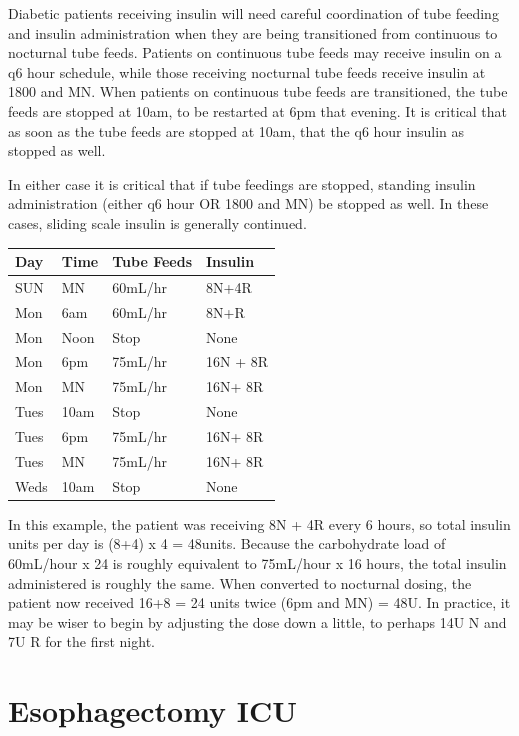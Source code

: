 \documentclass[
  letterpaper,
]{scrbook}
\begin{document}
Diabetic patients receiving insulin will need careful coordination of
tube feeding and insulin administration when they are being transitioned
from continuous to nocturnal tube feeds. Patients on continuous tube
feeds may receive insulin on a q6 hour schedule, while those receiving
nocturnal tube feeds receive insulin at 1800 and MN. When patients on
continuous tube feeds are transitioned, the tube feeds are stopped at
10am, to be restarted at 6pm that evening. It is critical that as soon
as the tube feeds are stopped at 10am, that the q6 hour insulin as
stopped as well.

In either case it is critical that if tube feedings are stopped,
standing insulin administration (either q6 hour OR 1800 and MN) be
stopped as well. In these cases, sliding scale insulin is generally
continued.

\begin{longtable}[]{@{}llll@{}}
\toprule\noalign{}
Day & Time & Tube Feeds & Insulin \\
\midrule\noalign{}
\endhead
\bottomrule\noalign{}
\endlastfoot
SUN & MN & 60mL/hr & 8N+4R \\
Mon & 6am & 60mL/hr & 8N+R \\
Mon & Noon & Stop & None \\
Mon & 6pm & 75mL/hr & 16N + 8R \\
Mon & MN & 75mL/hr & 16N+ 8R \\
Tues & 10am & Stop & None \\
Tues & 6pm & 75mL/hr & 16N+ 8R \\
Tues & MN & 75mL/hr & 16N+ 8R \\
Weds & 10am & Stop & None \\
\end{longtable}

In this example, the patient was receiving 8N + 4R every 6 hours, so
total insulin units per day is (8+4) x 4 = 48units. Because the
carbohydrate load of 60mL/hour x 24 is roughly equivalent to 75mL/hour x
16 hours, the total insulin administered is roughly the same. When
converted to nocturnal dosing, the patient now received 16+8 = 24 units
twice (6pm and MN) = 48U. In practice, it may be wiser to begin by
adjusting the dose down a little, to perhaps 14U N and 7U R for the
first night.

\chapter{Esophagectomy ICU}\label{esophagectomy-icu}
\end{document}
